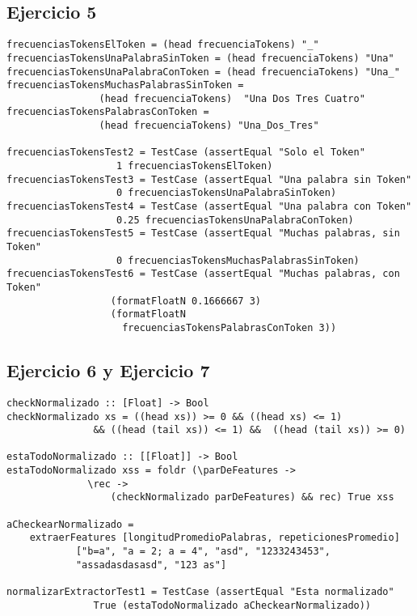 \documentclass[spanish, 10pt,a4paper]{article}
\numberwithin{equation}{section} %
\begin{document}
\subsection{Ejercicio 5}
\begin{lstlisting}
frecuenciasTokensElToken = (head frecuenciaTokens) "_"
frecuenciasTokensUnaPalabraSinToken = (head frecuenciaTokens) "Una"
frecuenciasTokensUnaPalabraConToken = (head frecuenciaTokens) "Una_"
frecuenciasTokensMuchasPalabrasSinToken = 
				(head frecuenciaTokens)  "Una Dos Tres Cuatro"
frecuenciasTokensPalabrasConToken = 
				(head frecuenciaTokens) "Una_Dos_Tres"

frecuenciasTokensTest2 = TestCase (assertEqual "Solo el Token" 
				   1 frecuenciasTokensElToken)
frecuenciasTokensTest3 = TestCase (assertEqual "Una palabra sin Token" 
				   0 frecuenciasTokensUnaPalabraSinToken)
frecuenciasTokensTest4 = TestCase (assertEqual "Una palabra con Token" 
				   0.25 frecuenciasTokensUnaPalabraConToken)
frecuenciasTokensTest5 = TestCase (assertEqual "Muchas palabras, sin Token" 
				   0 frecuenciasTokensMuchasPalabrasSinToken)
frecuenciasTokensTest6 = TestCase (assertEqual "Muchas palabras, con Token"  
				  (formatFloatN 0.1666667 3) 
				  (formatFloatN 
					frecuenciasTokensPalabrasConToken 3))
\end{lstlisting}

\subsection{Ejercicio 6 y Ejercicio 7}
\begin{lstlisting}
checkNormalizado :: [Float] -> Bool
checkNormalizado xs = ((head xs)) >= 0 && ((head xs) <= 1) 
		       && ((head (tail xs)) <= 1) &&  ((head (tail xs)) >= 0)

estaTodoNormalizado :: [[Float]] -> Bool
estaTodoNormalizado xss = foldr (\parDeFeatures -> 
			  \rec -> 
			      (checkNormalizado parDeFeatures) && rec) True xss

aCheckearNormalizado = 
	extraerFeatures [longitudPromedioPalabras, repeticionesPromedio]
			["b=a", "a = 2; a = 4", "asd", "1233243453", 
			"assadasdasasd", "123 as"]

normalizarExtractorTest1 = TestCase (assertEqual "Esta normalizado" 
			   True (estaTodoNormalizado aCheckearNormalizado))

\end{lstlisting}
\end{document}

